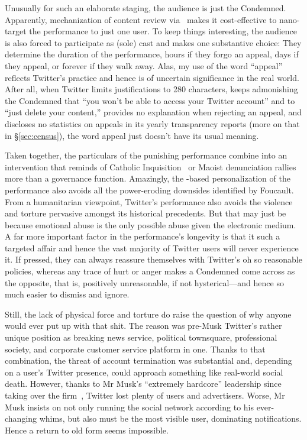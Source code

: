 Unusually for such an elaborate staging, the audience is just the Condemned.
Apparently, mechanization of content review via \AI\ makes it cost-effective to
nano-target the performance to just one user. To keep things interesting, the
audience is also forced to participate as (sole) cast and makes one substantive
choice: They determine the duration of the performance, hours if they forgo an
appeal, days if they appeal, or forever if they walk away. Alas, my use of the
word ``appeal'' reflects Twitter's practice and hence is of uncertain
significance in the real world. After all, when Twitter limits justifications to
280 characters, keeps admonishing the Condemned that ``you won't be able to
access your Twitter account'' and to ``just delete your content,'' provides no
explanation when rejecting an appeal, and discloses no statistics on appeals in
its yearly transparency reports (more on that in \S\ref{sec:census}), the word
appeal just doesn't have its usual meaning.

Taken together, the particulars of the punishing performance combine into an
intervention that reminds of Catholic
Inquisition~\cite{Lea1906a,Lea1906b,Lea1906c,Lea1906d} or Maoist denunciation
rallies~\cite{Yang2021} more than a governance function. Amazingly, the
\AI-based personalization of the performance also avoids all the power-eroding
downsides identified by Foucault. From a humanitarian viewpoint, Twitter's
performance also avoids the violence and torture pervasive amongst its
historical precedents. But that may just be because emotional abuse is the only
possible abuse given the electronic medium. A far more important factor in the
performance's longevity is that it such a targeted affair and hence the vast
majority of Twitter users will never experience it. If pressed, they can always
reassure themselves with Twitter's oh so reasonable policies, whereas any trace
of hurt or anger makes a Condemned come across as the opposite, that is,
positively unreasonable, if not hysterical---and hence so much easier to
dismiss and ignore.

Still, the lack of physical force and torture do raise the question of why
anyone would ever put up with that shit. The reason was pre-Musk Twitter's
rather unique position as breaking news service, political townsquare,
professional society, and corporate customer service platform in one. Thanks to
that combination, the threat of account termination was substantial and,
depending on a user's Twitter presence, could approach something like real-world
social death. However, thanks to Mr Musk's ``extremely hardcore'' leadership
since taking over the firm~\cite{SchifferNewtonea2023}, Twitter lost plenty of
users and advertisers. Worse, Mr Musk insists on not only running the social
network according to his ever-changing whims, but also must be the most visible
user, dominating notifications. Hence a return to old form seems impossible.


